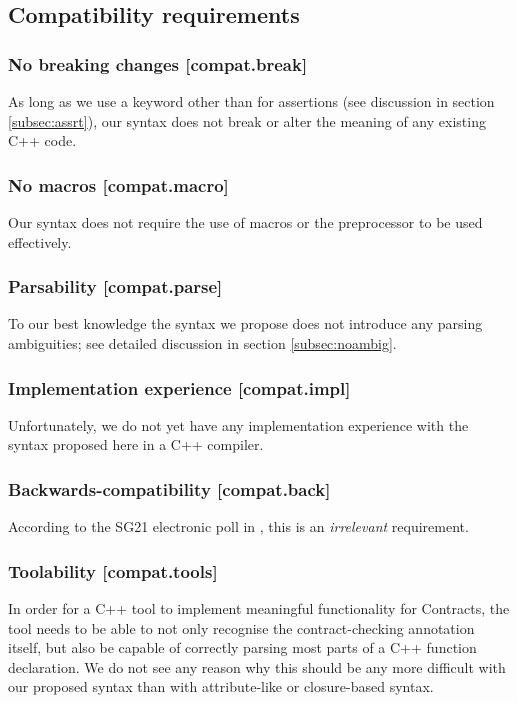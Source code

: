 \subsection{Compatibility requirements}

\subsubsection{No breaking changes  [compat.break]}

As long as we use a keyword other than  for assertions (see discussion in section \ref{subsec:assrt}), our syntax does not break or alter the meaning of any existing C++ code.

\subsubsection{No macros  [compat.macro]}

Our syntax does not require the use of macros or the preprocessor to be used effectively.

\subsubsection{Parsability  [compat.parse]}

To our best knowledge the syntax we propose does not introduce any parsing ambiguities; see detailed discussion in section \ref{subsec:noambig}.

\subsubsection{Implementation experience  [compat.impl]}

Unfortunately, we do not yet have any implementation experience with the syntax proposed here in a C++ compiler.

\subsubsection{Backwards-compatibility  [compat.back]}

According to the SG21 electronic poll in \cite{P2885R2}, this is an \emph{irrelevant} requirement.

\subsubsection{Toolability [compat.tools]}

In order for a C++ tool to implement meaningful functionality for Contracts, the tool needs to be able to not only recognise the contract-checking annotation itself, but also be capable of correctly parsing most parts of a C++ function declaration. We do not see any reason why this should be any more difficult with our proposed syntax than with attribute-like or closure-based syntax.

